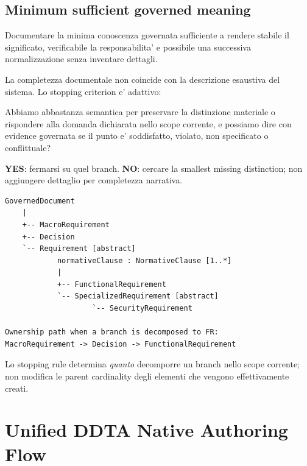 \documentclass[11pt,a4paper]{article}
\begin{document}
\subsection{Minimum sufficient governed meaning}
\closedtag

\begin{ddtaprinciple}
Documentare la minima conoscenza governata sufficiente a rendere stabile il significato, verificabile la responsabilita' e possibile una successiva normalizzazione senza inventare dettagli.
\end{ddtaprinciple}

La completezza documentale non coincide con la descrizione esaustiva del sistema. Lo stopping criterion e' adattivo:

\begin{ddtacheck}[title={Stopping criterion generale}]
Abbiamo abbastanza semantica per preservare la distinzione materiale o rispondere alla domanda dichiarata nello scope corrente, e possiamo dire con evidence governata se il punto e' soddisfatto, violato, non specificato o conflittuale?

\textbf{YES}: fermarsi su quel branch. \quad
\textbf{NO}: cercare la smallest missing distinction; non aggiungere dettaglio per completezza narrativa.
\end{ddtacheck}

\begin{ddtacore}[title={Structural baseline da non confondere con lo stopping rule}]
\begin{lstlisting}
GovernedDocument
    |
    +-- MacroRequirement
    +-- Decision
    `-- Requirement [abstract]
            normativeClause : NormativeClause [1..*]
            |
            +-- FunctionalRequirement
            `-- SpecializedRequirement [abstract]
                    `-- SecurityRequirement

Ownership path when a branch is decomposed to FR:
MacroRequirement -> Decision -> FunctionalRequirement
\end{lstlisting}
Lo stopping rule determina \emph{quanto} decomporre un branch nello scope corrente; non modifica le parent cardinality degli elementi che vengono effettivamente creati.
\end{ddtacore}

\clearpage
\section{Unified DDTA Native Authoring Flow}
\end{document}

